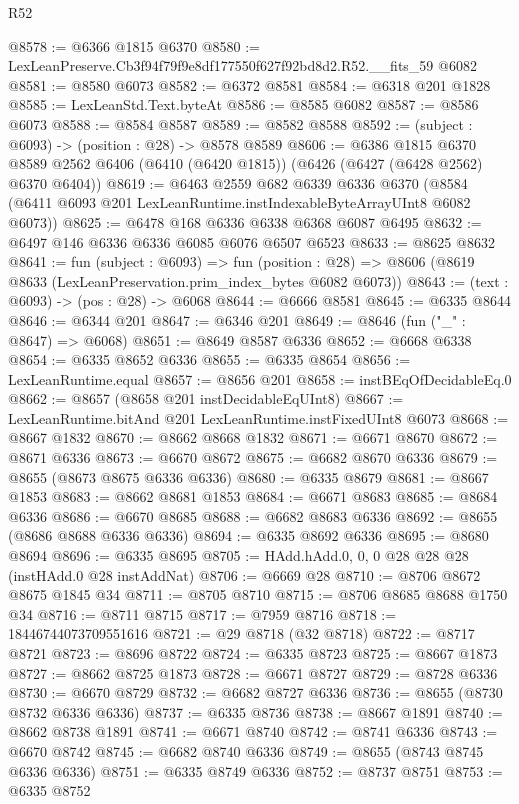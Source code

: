 \begin{lexlean}{R52}
\begin{coremodule}
@8578 := @6366 @1815 @6370
@8580 := LexLeanPreserve.Cb3f94f79f9e8df177550f627f92bd8d2.R52.__fits_59 @6082
@8581 := @8580 @6073
@8582 := @6372 @8581
@8584 := @6318 @201 @1828
@8585 := LexLeanStd.Text.byteAt
@8586 := @8585 @6082
@8587 := @8586 @6073
@8588 := @8584 @8587
@8589 := @8582 @8588
@8592 := (subject : @6093) -> (position : @28) -> @8578 @8589
@8606 := @6386
    @1815
    @6370
    @8589
    @2562
    @6406
    (@6410 (@6420 @1815))
    (@6426 (@6427 (@6428 @2562) @6370 @6404))
@8619 := @6463
    @2559
    @682
    @6339
    @6336
    @6370
    (@8584 (@6411 @6093 @201 LexLeanRuntime.instIndexableByteArrayUInt8 @6082 @6073))
@8625 := @6478 @168 @6336 @6338 @6368 @6087 @6495
@8632 := @6497 @146 @6336 @6336 @6085 @6076 @6507 @6523
@8633 := @8625 @8632
@8641 := fun (subject : @6093) =>
  fun (position : @28) => @8606 (@8619 @8633 (LexLeanPreservation.prim_index_bytes @6082 @6073))
@8643 := (text : @6093) -> (pos : @28) -> @6068
@8644 := @6666 @8581
@8645 := @6335 @8644
@8646 := @6344 @201
@8647 := @6346 @201
@8649 := @8646 (fun ("_" : @8647) => @6068)
@8651 := @8649 @8587 @6336
@8652 := @6668 @6338
@8654 := @6335 @8652 @6336
@8655 := @6335 @8654
@8656 := LexLeanRuntime.equal
@8657 := @8656 @201
@8658 := instBEqOfDecidableEq.{0}
@8662 := @8657 (@8658 @201 instDecidableEqUInt8)
@8667 := LexLeanRuntime.bitAnd @201 LexLeanRuntime.instFixedUInt8 @6073
@8668 := @8667 @1832
@8670 := @8662 @8668 @1832
@8671 := @6671 @8670
@8672 := @8671 @6336
@8673 := @6670 @8672
@8675 := @6682 @8670 @6336
@8679 := @8655 (@8673 @8675 @6336 @6336)
@8680 := @6335 @8679
@8681 := @8667 @1853
@8683 := @8662 @8681 @1853
@8684 := @6671 @8683
@8685 := @8684 @6336
@8686 := @6670 @8685
@8688 := @6682 @8683 @6336
@8692 := @8655 (@8686 @8688 @6336 @6336)
@8694 := @6335 @8692 @6336
@8695 := @8680 @8694
@8696 := @6335 @8695
@8705 := HAdd.hAdd.{0, 0, 0} @28 @28 @28 (instHAdd.{0} @28 instAddNat)
@8706 := @6669 @28
@8710 := @8706 @8672 @8675 @1845 @34
@8711 := @8705 @8710
@8715 := @8706 @8685 @8688 @1750 @34
@8716 := @8711 @8715
@8717 := @7959 @8716
@8718 := 18446744073709551616
@8721 := @29 @8718 (@32 @8718)
@8722 := @8717 @8721
@8723 := @8696 @8722
@8724 := @6335 @8723
@8725 := @8667 @1873
@8727 := @8662 @8725 @1873
@8728 := @6671 @8727
@8729 := @8728 @6336
@8730 := @6670 @8729
@8732 := @6682 @8727 @6336
@8736 := @8655 (@8730 @8732 @6336 @6336)
@8737 := @6335 @8736
@8738 := @8667 @1891
@8740 := @8662 @8738 @1891
@8741 := @6671 @8740
@8742 := @8741 @6336
@8743 := @6670 @8742
@8745 := @6682 @8740 @6336
@8749 := @8655 (@8743 @8745 @6336 @6336)
@8751 := @6335 @8749 @6336
@8752 := @8737 @8751
@8753 := @6335 @8752

\end{coremodule}
\end{lexlean}
